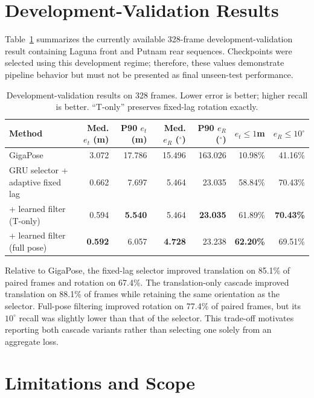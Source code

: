 \documentclass[10pt,twocolumn]{article}
\begin{document}
\section{Development-Validation Results}
\label{sec:results}

Table~\ref{tab:development} summarizes the currently available 328-frame
development-validation result containing Laguna front and Putnam rear
sequences. Checkpoints were selected using this development regime; therefore,
these values demonstrate pipeline behavior but must not be presented as final
unseen-test performance.

\begin{table}[t]
\centering
\caption{Development-validation results on 328 frames. Lower error is better;
higher recall is better. ``T-only'' preserves fixed-lag rotation exactly.}
\label{tab:development}
\begin{tabular}{lrrrrrr}
\toprule
Method & Med. $e_t$ (m) & P90 $e_t$ (m) & Med. $e_R$ ($^\circ$) &
P90 $e_R$ ($^\circ$) & $e_t\!\leq\!1$m & $e_R\!\leq\!10^\circ$ \\
\midrule
GigaPose & 3.072 & 17.786 & 15.496 & 163.026 & 10.98\% & 41.16\% \\
GRU selector + adaptive fixed lag & 0.662 & 7.697 & 5.464 & 23.035 & 58.84\% & 70.43\% \\
+ learned filter (T-only) & 0.594 & \textbf{5.540} & 5.464 & \textbf{23.035} & 61.89\% & \textbf{70.43\%} \\
+ learned filter (full pose) & \textbf{0.592} & 6.057 & \textbf{4.728} & 23.238 & \textbf{62.20\%} & 69.51\% \\
\bottomrule
\end{tabular}
\end{table}

Relative to GigaPose, the fixed-lag selector improved translation on 85.1\%
of paired frames and rotation on 67.4\%. The translation-only cascade improved
translation on 88.1\% of frames while retaining the same orientation as the
selector. Full-pose filtering improved rotation on 77.4\% of paired frames,
but its $10^\circ$ recall was slightly lower than that of the selector. This
trade-off motivates reporting both cascade variants rather than selecting one
solely from an aggregate loss.

\section{Limitations and Scope}
\end{document}
